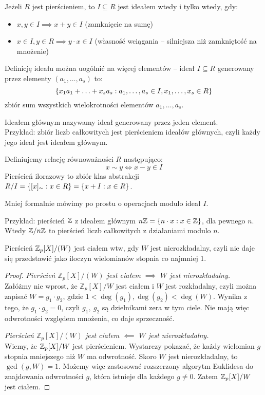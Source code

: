 \begin{definition}[Ideał]
Jeżeli \( R \) jest pierścieniem, to \( I \subseteq R \) jest ideałem wtedy i tylko wtedy, gdy:
\begin{itemize}
    \item \( x, y \in I \implies x + y \in I \) (zamknięcie na sumę)
    \item \( x \in I, y \in R \implies y\cdot x \in I \) (własność wciągania -- silniejsza niż zamkniętość na mnożenie)
\end{itemize}
\end{definition}
Definicję ideału można uogólnić na więcej elementów -- ideał \( I \subseteq R \) generowany przez elementy \( (a_1, \ldots, a_s) \) to:
\[
    \set{ x_1 a_1 + \ldots + x_s a_s : a_1, \ldots, a_s \in I, x_1, \ldots, x_s \in R}
\]
zbiór sum wszystkich wielokrotności elementów \( a_1, \ldots, a_s \).

Ideałem głównym nazywamy ideał generowany przez jeden element. \\
Przykład: zbiór liczb całkowitych jest pierścieniem ideałów głównych, czyli każdy jego ideał jest ideałem głównym.

\begin{definition}
Definiujemy relację równoważności \( R \) następująco:
\[
    x \sim y \iff x - y \in I
\]
Pierścień ilorazowy to zbiór klas abstrakcji \( R/I = \set{[x]_{\sim} : x \in R} = \set{x + I : x \in R} \).
\end{definition}
Mniej formalnie mówimy po prostu o operacjach modulo ideał \( I \).

Przykład: pierścień \( \mathbb{Z} \) z ideałem głównym \( n \integer = \set{n \cdot x : x \in \integer} \), dla pewnego \( n \).
Wtedy \( \mathbb{Z} / n\mathbb{Z} \) to pierścień liczb całkowitych z działaniami modulo \( n \).
\begin{theorem}
Pierścień \( \mathbb{Z}_p[X]/(W) \) jest ciałem wtw, gdy \( W \) jest nierozkładalny, czyli nie daje się przedstawić jako iloczyn wielomianów stopnia co najmniej 1.
\end{theorem}
\begin{proof}
    \textit{Pierścień \( \mathbb{Z}_p[X]/(W) \) jest ciałem \( \implies \) \( W \) jest nierozkładalny.} \\
    Załóżmy nie wprost, że \( \mathbb{Z}_p[X]/W \) jest ciałem i \( W \) jest rozkładalny, czyli można zapisać \linebreak \( W = g_1 \cdot g_2 \), gdzie \( 1 < \deg(g_1), \deg(g_2) < \deg(W) \).
    Wynika z tego, że \( g_1 \cdot g_2 = 0 \), czyli \( g_1, \ g_2 \) są dzielnikami zera w tym ciele. Nie mają więc odwrotności względem mnożenia, co daje sprzeczność.

    \textit{Pierścień \( \mathbb{Z}_p[X]/(W) \) jest ciałem \( \impliedby \) \( W \) jest nierozkładalny.} \\
    Wiemy, że \( \mathbb{Z}_p[X]/W \) jest pierścieniem. Wystarczy pokazać, że każdy wielomian \( g \) stopnia mniejszego niż \( W \) ma odwrotność.
    Skoro \( W \) jest nierozkładalny, to \( \gcd(g, W) = 1 \). Możemy więc zastosować rozszerzony algorytm Euklidesa do znajdowania odwrotności \( g \), która istnieje dla każdego \( g \neq 0 \). Zatem \( \mathbb{Z}_p[X]/W \) jest ciałem.
\end{proof}